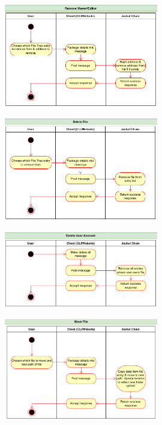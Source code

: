 \documentclass[a4paper]{article}
\begin{document}
\begin{figure}[!htbp]
\centering
\includegraphics[width=0.6\textwidth]{assets/filetree5.png}
\end{figure}

\begin{figure}[!htbp]
\centering
\includegraphics[width=0.6\textwidth]{assets/filetree6.png}
\end{figure}

\begin{figure}[!htbp]
\centering
\includegraphics[width=0.6\textwidth]{assets/filetree7.png}
\end{figure}

\begin{figure}[!htbp]
\centering
\includegraphics[width=0.6\textwidth]{assets/filetree8.png}
\end{figure}
\end{document}
